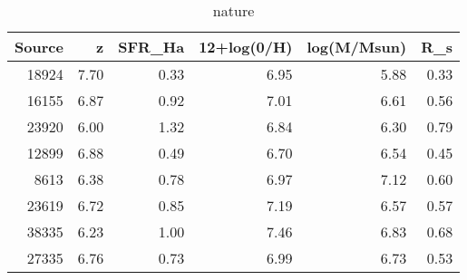 \begin{table}[H]
\caption{nature}
\label{nature}
\begin{tabular}{rrrrrr}
\toprule
Source & z & SFR_Ha & 12+log(0/H) & log(M/Msun) & R_s \\
\midrule
18924 & 7.70 & 0.33 & 6.95 & 5.88 & 0.33 \\
16155 & 6.87 & 0.92 & 7.01 & 6.61 & 0.56 \\
23920 & 6.00 & 1.32 & 6.84 & 6.30 & 0.79 \\
12899 & 6.88 & 0.49 & 6.70 & 6.54 & 0.45 \\
8613 & 6.38 & 0.78 & 6.97 & 7.12 & 0.60 \\
23619 & 6.72 & 0.85 & 7.19 & 6.57 & 0.57 \\
38335 & 6.23 & 1.00 & 7.46 & 6.83 & 0.68 \\
27335 & 6.76 & 0.73 & 6.99 & 6.73 & 0.53 \\
\bottomrule
\end{tabular}
\end{table}
